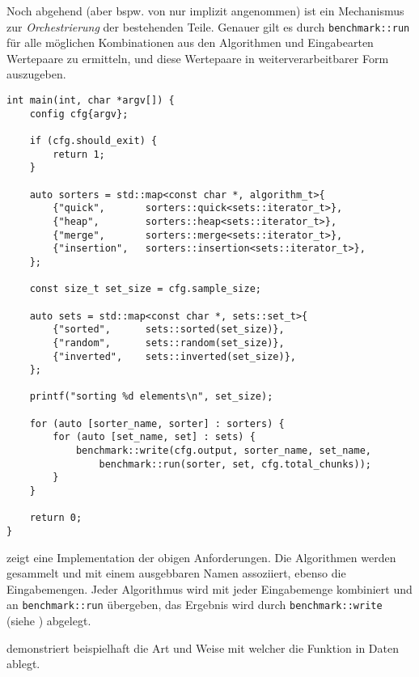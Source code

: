 Noch abgehend (aber bspw. von \cite{mcg2012} nur implizit angenommen) ist ein Mechanismus zur \emph{Orchestrierung} der bestehenden Teile. Genauer gilt es durch \lstinline{benchmark::run} für alle möglichen Kombinationen aus den Algorithmen und Eingabearten Wertepaare zu ermitteln, und diese Wertepaare in weiterverarbeitbarer Form auszugeben.

\begin{lstlisting}[label=lst:main, caption={Die \lstinline{main} Funktion des zur Ermittlung der praktischen Effizienz verwendeten Programms.}]
int main(int, char *argv[]) {
	config cfg{argv};

	if (cfg.should_exit) {
		return 1;
	}

	auto sorters = std::map<const char *, algorithm_t>{
		{"quick",       sorters::quick<sets::iterator_t>},
		{"heap",        sorters::heap<sets::iterator_t>},
		{"merge",       sorters::merge<sets::iterator_t>},
		{"insertion",   sorters::insertion<sets::iterator_t>},
	};

	const size_t set_size = cfg.sample_size;

	auto sets = std::map<const char *, sets::set_t>{
		{"sorted",      sets::sorted(set_size)},
		{"random",      sets::random(set_size)},
		{"inverted",    sets::inverted(set_size)},
	};

	printf("sorting %d elements\n", set_size);

	for (auto [sorter_name, sorter] : sorters) {
		for (auto [set_name, set] : sets) {
			benchmark::write(cfg.output, sorter_name, set_name,
				benchmark::run(sorter, set, cfg.total_chunks));
		}
	}

	return 0;
}
\end{lstlisting}

 zeigt eine Implementation der obigen Anforderungen. Die Algorithmen werden gesammelt und mit einem ausgebbaren Namen assoziiert, ebenso die Eingabemengen. Jeder Algorithmus wird mit jeder Eingabemenge kombiniert und an \lstinline{benchmark::run} übergeben, das Ergebnis wird durch \lstinline{benchmark::write} (siehe ) abgelegt.

 demonstriert beispielhaft die Art und Weise mit welcher die Funktion in  Daten ablegt.




